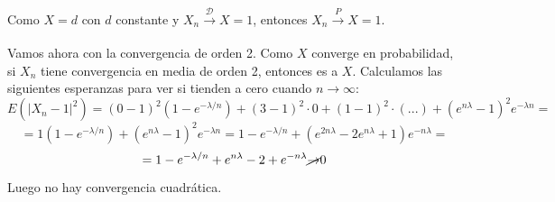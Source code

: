 \documentclass[openany]{book}
\begin{document}
\begin{exercise}
    Como $ X = d $ con $ d $ constante y $ X_n \xrightarrow[]{\mathcal{D}} X = 1 $, entonces $ X_n \xrightarrow[]{P} X=1 $.

    Vamos ahora con la convergencia de orden 2. Como $ X $ converge en probabilidad, si $ X_n $ tiene convergencia en media de orden 2, entonces es a $ X $. Calculamos las siguientes esperanzas para ver si tienden a cero cuando $ n\to\infty $:
    $$ E(|X_n-1|^2) = (0-1)^2 (1-e^{-\lambda/n})+(3-1)^2\cdot 0 + (1-1)^2\cdot (...) + (e^{n\lambda}-1)^2 e^{-\lambda n} = $$ 
    $$=1(1-e^{-\lambda/n}) + (e^{n\lambda}-1)^2e^{-\lambda n} = 1-e^{-\lambda/n} +(e^{2n\lambda}-2e^{n\lambda}+1)e^{-n\lambda} = $$
    $$ = 1-e^{-\lambda/n} + e^{n\lambda}-2+e^{-n\lambda} \cancel{\to} 0 $$

    Luego no hay convergencia cuadrática.
\end{exercise}
\end{document}
